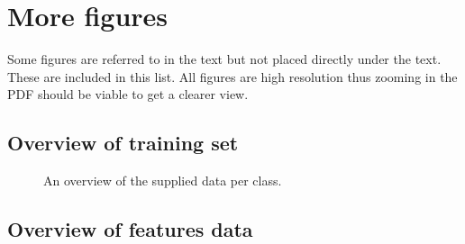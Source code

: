 \chapter*{More figures}

Some figures are referred to in the text but not placed directly under the text. These are included in this list. All figures are high resolution thus zooming in the PDF should be viable to get a clearer view.


\section*{Overview of training set}

\begin{figure}[H]
    \begin{center}
    \end{center}
    \captionsetup{width=0.65\linewidth}
    \captionsetup{justification=centering}
    \caption{An overview of the supplied data per class.}
    \label{fig:1-data_analysis-labeled_data_overview.png}
\end{figure}


\section*{Overview of features data}

